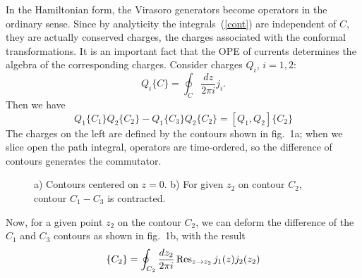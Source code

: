 In the Hamiltonian form, the Virasoro generators become
operators in the ordinary sense.  Since by analyticity the
integrals~(\ref{cont}) are independent of $C$, they are actually
conserved charges, the charges associated with the conformal
transformations.  It is an important fact that the OPE of currents
determines the algebra of the corresponding charges.  Consider
charges $Q_i$, $i = 1,2$:
\begin{equation}
Q_i\{C\} = \oint_C \frac{dz}{2\pi i }j_{i}.
\end{equation}
Then we have 
\begin{equation}
Q_1\{C_1\} Q_2\{C_2\} - Q_1\{C_3\} Q_2\{C_2\} =
[Q_1, Q_2]\{C_2\}
\end{equation}
The charges on the left are defined by the contours shown in
fig.~1a; when we slice open the path integral, operators are
time-ordered, so the difference of contours generates the
commutator.
\begin{figure}
\begin{center}
\leavevmode
{}
\end{center}
\caption[]{a) Contours centered on $z=0$.  b) For given
$z_2$ on contour $C_2$, contour $C_1 - C_3$ is contracted.}
\end{figure}
Now, for a given point $z_2$ on the contour $C_2$,
we can deform the difference of the $C_1$ and $C_3$ contours as
shown in fig.~1b, with the result
\begin{equation}
[Q_1, Q_2]\{C_2\} = \oint_{C_2} \frac{dz_2}{2\pi i }\,
{\rm Res}_{z \to z_2}\,j_1(z)j_2(z_2)
\end{equation}

